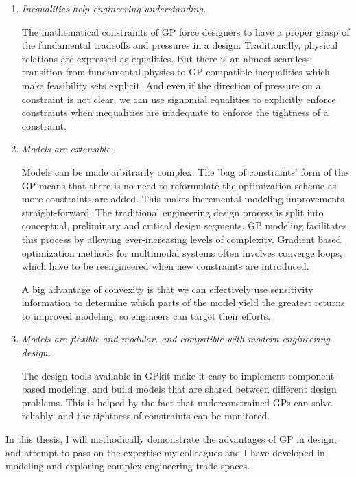 \begin{enumerate}

    \item \textit{Inequalities help engineering understanding.}

The mathematical constraints of \gls{GP} force designers to have a proper grasp
of the fundamental tradeoffs and pressures in a design.
    Traditionally, physical relations are expressed as equalities. But there is an
almost-seamless transition from fundamental physics to GP-compatible
inequalities which make feasibility sets explicit.
And even if the direction of pressure on a constraint is not clear,
we can use signomial equalities to explicitly enforce constraints when inequalities
    are inadequate to enforce the tightness of a constraint.

    \item \textit{Models are extensible.}
    
Models can be made arbitrarily complex. The 'bag of constraints' form of the GP
means that there is no need to reformulate the optimization scheme as more
constraints are added. This makes incremental modeling improvements straight-forward.
The traditional engineering design process is split into conceptual, preliminary
and critical design segments. GP modeling facilitates this process by allowing
ever-increasing levels of complexity. Gradient based optimization methods for
multimodal systems often involves
converge loops, which have to be reengineered when new constraints are
introduced.

A big advantage of convexity is that we can effectively use sensitivity information
to determine which parts of the
model yield the greatest returns to improved modeling, so engineers can target
their efforts.

    \item \textit{Models are flexible and modular, and compatible with modern
    engineering design.}

The design tools available in GPkit make it easy to
implement component-based modeling, and build models that are shared between
different design problems.
This is helped by the fact that underconstrained \gls{GP}s can solve reliably,
and the tightness of constraints can be monitored.

\end{enumerate}

In this thesis, I will methodically demonstrate the advantages of \gls{GP} in design,
and attempt to pass on the expertise my colleagues and I have developed in modeling
and exploring complex engineering trade spaces.




